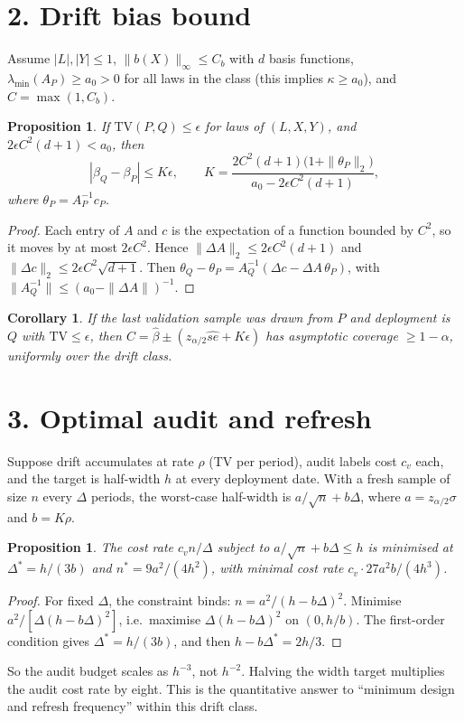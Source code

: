 \documentclass[11pt]{article}
\newtheorem{proposition}[theorem]{Proposition}
\newtheorem{corollary}[theorem]{Corollary}
\theoremstyle{definition}
\begin{document}
\section*{2. Drift bias bound}
Assume $|L|,|Y|\le1$, $\|b(X)\|_\infty\le C_b$ with $d$ basis functions, $\lambda_{\min}(A_P)\ge a_0>0$ for all laws in the
class (this implies $\kappa\ge a_0$), and $C=\max(1,C_b)$.
\begin{proposition}\label{prop:tv}
If $\mathrm{TV}(P,Q)\le\epsilon$ for laws of $(L,X,Y)$, and $2\epsilon C^2(d+1)<a_0$, then
\[
 |\beta_Q-\beta_P|\le K\epsilon,\qquad K=\frac{2C^2(d+1)\bigl(1+\|\theta_P\|_2\bigr)}{a_0-2\epsilon C^2(d+1)},
\]
where $\theta_P=A_P^{-1}c_P$.
\end{proposition}
\begin{proof}
Each entry of $A$ and $c$ is the expectation of a function bounded by $C^2$, so it moves by at most $2\epsilon C^2$.
Hence $\|\Delta A\|_2\le2\epsilon C^2(d+1)$ and $\|\Delta c\|_2\le2\epsilon C^2\sqrt{d+1}$. Then
$\theta_Q-\theta_P=A_Q^{-1}(\Delta c-\Delta A\,\theta_P)$, with $\|A_Q^{-1}\|\le(a_0-\|\Delta A\|)^{-1}$.
\end{proof}
\begin{corollary}
If the last validation sample was drawn from $P$ and deployment is $Q$ with $\mathrm{TV}\le\epsilon$, then
$C=\widehat\beta\pm(z_{\alpha/2}\widehat{se}+K\epsilon)$ has asymptotic coverage $\ge1-\alpha$, uniformly over the drift class.
\end{corollary}

\section*{3. Optimal audit and refresh}
Suppose drift accumulates at rate $\rho$ (TV per period), audit labels cost $c_v$ each, and the target is half-width $h$
at every deployment date. With a fresh sample of size $n$ every $\Delta$ periods, the worst-case half-width is
$a/\sqrt n+b\Delta$, where $a=z_{\alpha/2}\sigma$ and $b=K\rho$.
\begin{proposition}\label{prop:opt}
The cost rate $c_vn/\Delta$ subject to $a/\sqrt n+b\Delta\le h$ is minimised at $\Delta^*=h/(3b)$ and $n^*=9a^2/(4h^2)$,
with minimal cost rate $c_v\cdot27a^2b/(4h^3)$.
\end{proposition}
\begin{proof}
For fixed $\Delta$, the constraint binds: $n=a^2/(h-b\Delta)^2$. Minimise $a^2/[\Delta(h-b\Delta)^2]$, i.e.\ maximise
$\Delta(h-b\Delta)^2$ on $(0,h/b)$. The first-order condition gives $\Delta^*=h/(3b)$, and then $h-b\Delta^*=2h/3$.
\end{proof}
So the audit budget scales as $h^{-3}$, not $h^{-2}$. Halving the width target multiplies the audit cost rate by eight.
This is the quantitative answer to ``minimum design and refresh frequency'' within this drift class.
\end{document}
